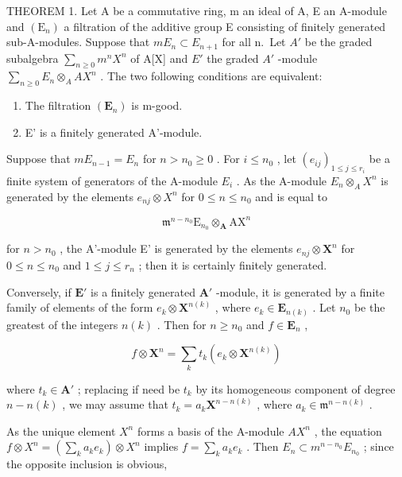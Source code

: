 THEOREM 1. Let A be a commutative ring, m an ideal of A, E an A-module and \((\mathrm{E}_{n})\) a filtration of the additive group E consisting of finitely generated sub-A-modules. Suppose that \(mE_{n} \subset E_{n+1}\) for all n.~Let \(A'\) be the graded subalgebra \(\sum_{n \geqslant 0} m^{n} X^{n}\) of A{[}X{]} and \(E'\) the graded \(A'\) -module \(\sum_{n \geqslant 0} E_{n} \otimes_{A} AX^{n}\) . The two following conditions are equivalent:

\begin{enumerate}
\def\labelenumi{(\alph{enumi})}
\item
  The filtration \((\mathbf{E}_n)\) is m-good.
\item
  E' is a finitely generated A'-module.
\end{enumerate}

Suppose that \(mE_{n-1} = E_n\) for \(n > n_0 \geqslant 0\) . For \(i \leqslant n_0\) , let \((e_{ij})_{1 \leqslant j \leqslant r_i}\) be a finite system of generators of the A-module \(E_i\) . As the A-module \(E_n \otimes_A X^n\) is generated by the elements \(e_{nj} \otimes X^n\) for \(0 \leqslant n \leqslant n_0\) and is equal to

\[
\mathfrak {m} ^ {n - n _ {0}} \mathrm{E} _ {n _ {0}} \otimes_ {\mathbf {A}} \mathrm{AX} ^ {n}
\]

for \(n > n_0\) , the A'-module E' is generated by the elements \(e_{nj} \otimes \mathbf{X}^n\) for \(0 \leqslant n \leqslant n_0\) and \(1 \leqslant j \leqslant r_n\) ; then it is certainly finitely generated.

Conversely, if \(\mathbf{E}'\) is a finitely generated \(\mathbf{A}'\) -module, it is generated by a finite family of elements of the form \(e_k \otimes \mathbf{X}^{n(k)}\) , where \(e_k \in \mathbf{E}_{n(k)}\) . Let \(n_0\) be the greatest of the integers \(n(k)\) . Then for \(n \geqslant n_0\) and \(f \in \mathbf{E}_n\) ,

\[
f \otimes \mathbf {X} ^ {n} = \sum_ {k} t _ {k} (e _ {k} \otimes \mathbf {X} ^ {n (k)})
\]

where \(t_k \in \mathbf{A}'\) ; replacing if need be \(t_k\) by its homogeneous component of degree \(n - n(k)\) , we may assume that \(t_k = a_k \mathbf{X}^{n - n(k)}\) , where \(a_k \in \mathfrak{m}^{n - n(k)}\) .

As the unique element \(X^{n}\) forms a basis of the A-module \(AX^{n}\) , the equation \(f \otimes X^{n} = \left( \sum_{k} a_{k} e_{k} \right) \otimes X^{n}\) implies \(f = \sum_{k} a_{k} e_{k}\) . Then \(E_{n} \subset m^{n-n_{0}} E_{n_{0}}\) ; since the opposite inclusion is obvious,

